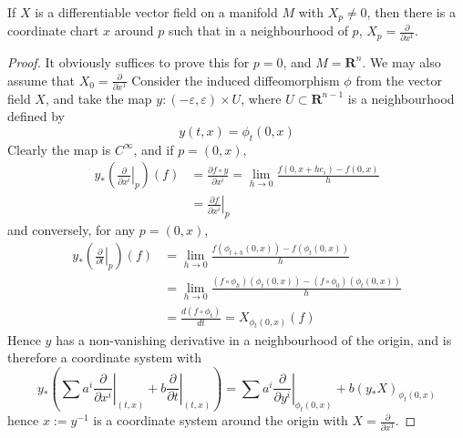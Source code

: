 \begin{theorem}
    If $X$ is a differentiable vector field on a manifold $M$ with $X_p \neq 0$, then there is a coordinate chart $x$ around $p$ such that in a neighbourhood of $p$, $X_p = \frac{\partial}{\partial x^1}$.
\end{theorem}
\begin{proof}
    It obviously suffices to prove this for $p = 0$, and $M = \mathbf{R}^n$. We may also assume that $X_0 = \frac{\partial}{\partial x^1}$ Consider the induced diffeomorphism $\phi$ from the vector field $X$, and take the map $y: (-\varepsilon, \varepsilon) \times U$, where $U \subset \mathbf{R}^{n-1}$ is a neighbourhood defined by
    \[ y(t,x) = \phi_t(0,x) \]
    Clearly the map is $C^\infty$, and if $p = (0,x)$,
    \begin{align*}
        y_* \left( \left. \frac{\partial}{\partial x^i} \right|_p \right)(f) &= \frac{\partial f \circ y}{\partial x^i} = \lim_{h \to 0} \frac{f(0,x + he_i) - f(0,x)}{h}\\
        &= \left. \frac{\partial f}{\partial x^i} \right|_p
    \end{align*}
    and conversely, for any $p = (0,x)$,
    \begin{align*}
        y_* \left( \left. \frac{\partial}{\partial t} \right|_p \right) (f) &= \lim_{h \to 0} \frac{f(\phi_{t + h}(0,x)) - f(\phi_t(0,x))}{h}\\
        &= \lim_{h \to 0} \frac{(f \circ \phi_h)(\phi_t(0,x)) - (f \circ \phi_0)(\phi_t(0,x))}{h}\\
        &= \frac{d (f \circ \phi_t)}{dt} = X_{\phi_t(0,x)}(f)
    \end{align*}
    Hence $y$ has a non-vanishing derivative in a neighbourhood of the origin, and is therefore a coordinate system with
    \[ y_* \left( \sum a^i \left. \frac{\partial}{\partial x^i} \right|_{(t,x)} + b \left. \frac{\partial}{\partial t} \right|_{(t,x)} \right) = \sum a^i \left. \frac{\partial}{\partial y^i} \right|_{\phi_t(0,x)} + b (y_*X)_{\phi_t(0,x)}  \]
    hence $x := y^{-1}$ is a coordinate system around the origin with $X = \frac{\partial}{\partial x^1}$.
\end{proof}

